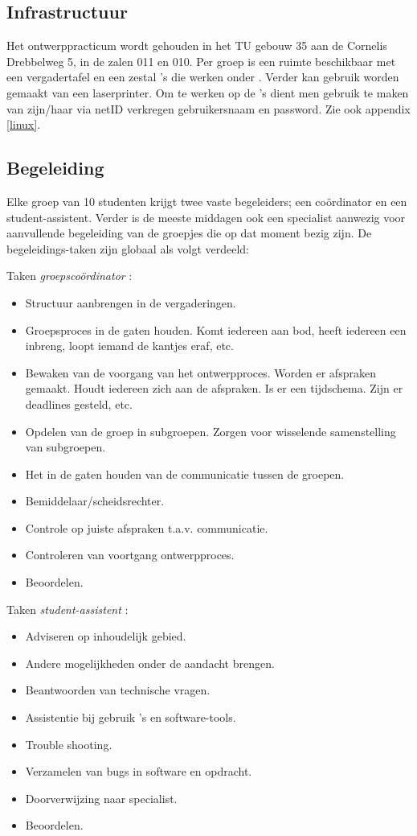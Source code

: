 \subsection{Infrastructuur}

Het ontwerppracticum wordt gehouden in het 
TU gebouw 35 aan de Cornelis Drebbelweg 5, in de zalen 011 en 010.
Per groep is een ruimte beschikbaar met een vergadertafel en een
zestal 's die werken onder .
Verder kan gebruik worden gemaakt van een laserprinter.
Om te werken op de 's dient men gebruik te maken
van zijn/haar via netID verkregen gebruikersnaam en password.
Zie ook appendix \ref{linux}.

\subsection{Begeleiding}

Elke groep van 10 studenten krijgt twee vaste begeleiders; een
co\"ordinator en een student-assistent. 
Verder is de meeste middagen ook een specialist aanwezig
voor aanvullende begeleiding van de groepjes die op dat moment
bezig zijn.
De begeleidings-taken zijn globaal als 
volgt verdeeld:

Taken {\it groepsco\"ordinator} :
\begin{itemize}
\item
Structuur aanbrengen in de vergaderingen.
\item
Groepsproces in de gaten houden. Komt iedereen aan bod, heeft
iedereen een inbreng, loopt iemand de kantjes eraf, etc.
\item
Bewaken van de voorgang van het ontwerpproces. 
Worden er afspraken gemaakt. 
Houdt iedereen zich aan de afspraken. 
Is er een tijdschema. 
Zijn er deadlines gesteld, etc.
\item
Opdelen van de groep in subgroepen. 
Zorgen voor wisselende samenstelling van subgroepen.
\item
Het in de gaten houden van de communicatie tussen de groepen.
\item
Bemiddelaar/scheidsrechter. 
\item
Controle op juiste afspraken t.a.v. communicatie.
\item
Controleren van voortgang ontwerpproces.
\item
Beoordelen.
\end{itemize}

\vglue 20pt
Taken {\it student-assistent} :
\begin{itemize}
\item
Adviseren op inhoudelijk gebied.
\item
Andere mogelijkheden onder de aandacht brengen.
\item
Beantwoorden van technische vragen.
\item
Assistentie bij gebruik 's en software-tools.
\item
Trouble shooting.
\item
Verzamelen van bugs in software en opdracht.
\item
Doorverwijzing naar specialist.
\item
Beoordelen.
\end{itemize}

